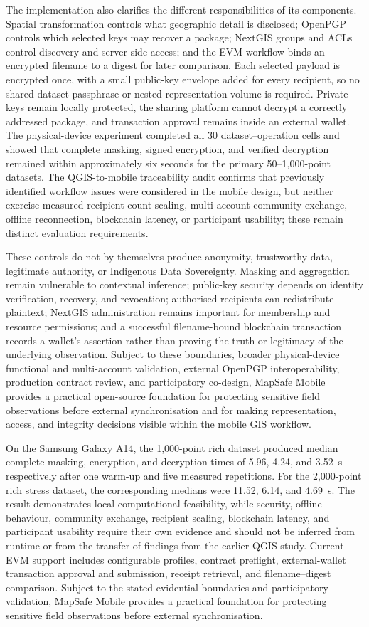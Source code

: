 \documentclass[a4paper,UKenglish,cleveref,autoref,thm-restate]{lipics-v2021}
\begin{document}
The implementation also clarifies the different responsibilities of its components. Spatial transformation controls what geographic detail is disclosed; OpenPGP controls which selected keys may recover a package; NextGIS groups and ACLs control discovery and server-side access; and the EVM workflow binds an encrypted filename to a digest for later comparison. Each selected payload is encrypted once, with a small public-key envelope added for every recipient, so no shared dataset passphrase or nested representation volume is required. Private keys remain locally protected, the sharing platform cannot decrypt a correctly addressed package, and transaction approval remains inside an external wallet. The physical-device experiment completed all 30 dataset--operation cells and showed that complete masking, signed encryption, and verified decryption remained within approximately six seconds for the primary 50--1,000-point datasets. The QGIS-to-mobile traceability audit confirms that previously identified workflow issues were considered in the mobile design, but neither exercise measured recipient-count scaling, multi-account community exchange, offline reconnection, blockchain latency, or participant usability; these remain distinct evaluation requirements.

These controls do not by themselves produce anonymity, trustworthy data, legitimate authority, or Indigenous Data Sovereignty. Masking and aggregation remain vulnerable to contextual inference; public-key security depends on identity verification, recovery, and revocation; authorised recipients can redistribute plaintext; NextGIS administration remains important for membership and resource permissions; and a successful filename-bound blockchain transaction records a wallet's assertion rather than proving the truth or legitimacy of the underlying observation. Subject to these boundaries, broader physical-device functional and multi-account validation, external OpenPGP interoperability, production contract review, and participatory co-design, MapSafe Mobile provides a practical open-source foundation for protecting sensitive field observations before external synchronisation and for making representation, access, and integrity decisions visible within the mobile GIS workflow.

On the Samsung Galaxy A14, the 1,000-point rich dataset produced median complete-masking, encryption, and decryption times of 5.96, 4.24, and 3.52~s respectively after one warm-up and five measured repetitions. For the 2,000-point rich stress dataset, the corresponding medians were 11.52, 6.14, and 4.69~s. The result demonstrates local computational feasibility, while security, offline behaviour, community exchange, recipient scaling, blockchain latency, and participant usability require their own evidence and should not be inferred from runtime or from the transfer of findings from the earlier QGIS study. Current EVM support includes configurable profiles, contract preflight, external-wallet transaction approval and submission, receipt retrieval, and filename--digest comparison. Subject to the stated evidential boundaries and participatory validation, MapSafe Mobile provides a practical foundation for protecting sensitive field observations before external synchronisation.
\end{document}
